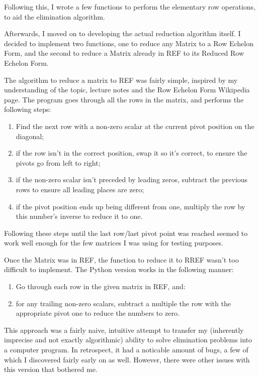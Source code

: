 \documentclass[11pt, a4paper]{article}
\begin{document}
Following this, I wrote a few functions to perform the elementary row operations, to aid the elimination algorithm.

Afterwards, I moved on to developing the actual reduction algorithm itself.
I decided to implement two functions, one to reduce any Matrix to a Row Echelon Form, and the second to reduce a Matrix already in REF to its Reduced Row Echelon Form.

The algorithm to reduce a matrix to REF was fairly simple, inspired by my understanding of the topic, lecture notes and the Row Echelon Form Wikipedia page.
The program goes through all the rows in the matrix, and performs the following steps:

\begin{enumerate}
  \item Find the next row with a non-zero scalar at the current pivot position on the diagonal;
  \item if the row isn't in the correct position, swap it so it's correct, to ensure the pivots go from left to right;
  \item if the non-zero scalar isn't preceded by leading zeros, subtract the previous rows to ensure all leading places are zero;
  \item if the pivot position ends up being different from one, multiply the row by this number's inverse to reduce it to one.
\end{enumerate}

Following these steps until the last row/last pivot point was reached seemed to work well enough for the few matrices I was using for testing purposes.

Once the Matrix was in REF, the function to reduce it to RREF wasn't too difficult to implement.
The Python version works in the following manner:

\begin{enumerate}
  \item Go through each row in the given matrix in REF, and:
  \item for any trailing non-zero scalars, subtract a multiple the row with the appropriate pivot one to reduce the numbers to zero.
\end{enumerate}

This approach was a fairly naive, intuitive attempt to transfer my (inherently imprecise and not exactly algorithmic) ability to solve elimination problems into a computer program.
In retrospect, it had a noticable amount of bugs, a few of which I discovered fairly early on as well.
However, there were other issues with this version that bothered me.
\end{document}
